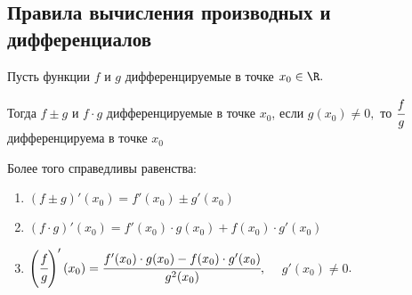 \subsection{Правила вычисления производных и дифференциалов}
\begin{theorem} \hypertarget{thrm5.3}{}
	Пусть функции $f$ и $g$ дифференцируемые в точке $x_{0}\in \R.$
	
	Тогда $f \pm g$ и $ f\cdot g$ дифференцируемые в точке $x_{0}$, если $g(x_{0}) \neq 0,$ то $\cfrac{f}{g}$ дифференцируема в точке $x_{0}$
	
	Более того справедливы равенства: 
	\begin{enumerate}
		\item $(f \pm g)'(x_{0}) = f'(x_{0}) \pm g'({x_{0}}) $
		\item $(f \cdot g)'(x_{0}) = f'(x_{0}) \cdot g({x_{0}}) + f(x_{0}) \cdot g'({x_{0}})$
		\item $\left(\cfrac{f}{g}\right)' (x_{0}) = \cfrac{f'(x_{0}) \cdot g({x_{0}}) - f(x_{0}) \cdot g'({x_{0}})}{g^{2}(x_{0})}, \quad$ $g'(x_{0}) \neq 0$.
	\end{enumerate}
\end{theorem}
